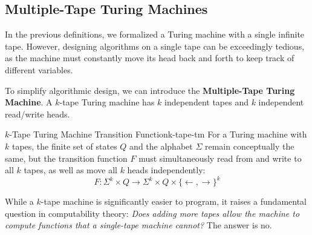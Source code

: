 \subsection{Multiple-Tape Turing Machines}
In the previous definitions, we formalized a Turing machine with a single infinite tape. However, designing algorithms on a single tape can be exceedingly tedious, as the machine must constantly move its head back and forth to keep track of different variables. 

To simplify algorithmic design, we can introduce the \textbf{Multiple-Tape Turing Machine}. A \(k\)-tape Turing machine has \(k\) independent tapes and \(k\) independent read/write heads.

\begin{definition}{\(k\)-Tape Turing Machine Transition Function}{k-tape-tm}
    For a Turing machine with \(k\) tapes, the finite set of states \(Q\) and the alphabet \(\Sigma\) remain conceptually the same, but the transition function \(F\) must simultaneously read from and write to all \(k\) tapes, as well as move all \(k\) heads independently:
    \[
        F: \Sigma^k \times Q \longrightarrow \Sigma^k \times Q \times \{\leftarrow, \rightarrow\}^k
    \]
\end{definition}

While a \(k\)-tape machine is significantly easier to program, it raises a fundamental question in computability theory: \textit{Does adding more tapes allow the machine to compute functions that a single-tape machine cannot?} The answer is no. 

